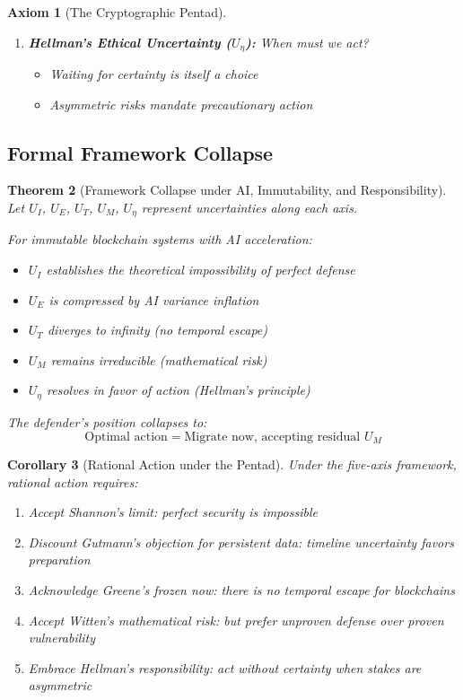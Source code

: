 \documentclass[11pt,a4paper]{article}
\newtheorem{theorem}{Theorem}[section]
\newtheorem{corollary}[theorem]{Corollary}
\newtheorem{axiom}[theorem]{Axiom}
\begin{document}
\begin{axiom}[The Cryptographic Pentad]
\begin{enumerate}
    \item \textbf{Hellman's Ethical Uncertainty ($U_\eta$):} \textit{When must we act?}
    \begin{itemize}[noitemsep]
        \item Waiting for certainty is itself a choice
        \item Asymmetric risks mandate precautionary action
    \end{itemize}
\end{enumerate}
\end{axiom}

\subsection{Formal Framework Collapse}

\begin{theorem}[Framework Collapse under AI, Immutability, and Responsibility]
Let $U_I$, $U_E$, $U_T$, $U_M$, $U_\eta$ represent uncertainties along each axis.

For immutable blockchain systems with AI acceleration:
\begin{itemize}[noitemsep]
    \item $U_I$ establishes the theoretical impossibility of perfect defense
    \item $U_E$ is compressed by AI variance inflation
    \item $U_T$ diverges to infinity (no temporal escape)
    \item $U_M$ remains irreducible (mathematical risk)
    \item $U_\eta$ resolves in favor of action (Hellman's principle)
\end{itemize}

The defender's position collapses to:
\begin{equation}
\text{Optimal action} = \text{Migrate now, accepting residual } U_M
\end{equation}
\end{theorem}

\begin{corollary}[Rational Action under the Pentad]
Under the five-axis framework, rational action requires:
\begin{enumerate}[noitemsep]
    \item Accept Shannon's limit: perfect security is impossible
    \item Discount Gutmann's objection for persistent data: timeline uncertainty favors preparation
    \item Acknowledge Greene's frozen now: there is no temporal escape for blockchains
    \item Accept Witten's mathematical risk: but prefer unproven defense over proven vulnerability
    \item Embrace Hellman's responsibility: act without certainty when stakes are asymmetric
\end{enumerate}
\end{corollary}
\end{document}

